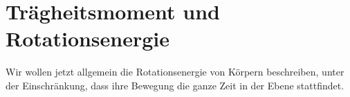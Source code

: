 \section{Trägheitsmoment und Rotationsenergie}
Wir wollen jetzt allgemein die Rotationsenergie von Körpern beschreiben, unter der Einschränkung, dass ihre Bewegung die ganze Zeit in der Ebene stattfindet.
\begin{figure}
  \caption{}
  \label{}
\end{figure}

